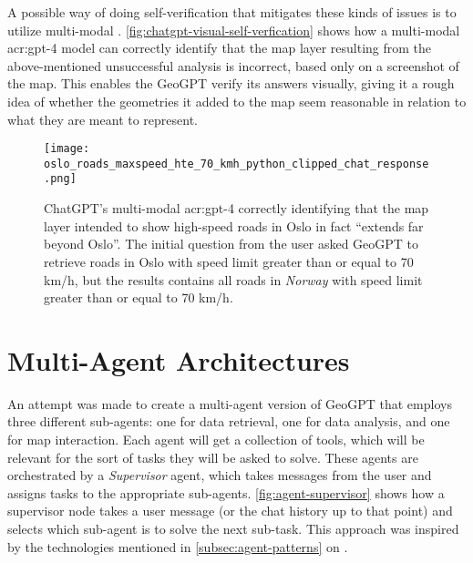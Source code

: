 A possible way of doing self-verification that mitigates these kinds of issues is to utilize multi-modal . \autoref{fig:chatgpt-visual-self-verfication} shows how a multi-modal \acrshort{acr:gpt}-4 model can correctly identify that the map layer resulting from the above-mentioned unsuccessful analysis is incorrect, based only on a screenshot of the map. This enables the GeoGPT verify its answers visually, giving it a rough idea of whether the geometries it added to the map seem reasonable in relation to what they are meant to represent.

\begin{figure}
    \centering
    \texttt{[image: oslo\_roads\_maxspeed\_hte\_70\_kmh\_python\_clipped\_chat\_response.png]}
    \caption[Using the multi-modal GPT-4 model to identify errors in image of generated road map layer]{ChatGPT's multi-modal \acrshort{acr:gpt}-4 correctly identifying that the map layer intended to show high-speed roads in Oslo in fact \enquote{extends far beyond Oslo}. The initial question from the user asked GeoGPT to retrieve roads in Oslo with speed limit greater than or equal to 70 km/h, but the results contains all roads in \textit{Norway} with speed limit greater than or equal to 70 km/h.}
    \label{fig:chatgpt-visual-self-verfication}
\end{figure}


\section{Multi-Agent Architectures}
\label{sec:multi-agent-architectures}

An attempt was made to create a multi-agent version of GeoGPT that employs three different sub-agents: one for data retrieval, one for data analysis, and one for map interaction. Each agent will get a collection of tools, which will be relevant for the sort of tasks they will be asked to solve. These agents are orchestrated by a \textit{Supervisor} agent, which takes messages from the user and assigns tasks to the appropriate sub-agents. \autoref{fig:agent-supervisor} shows how a supervisor node takes a user message (or the chat history up to that point) and selects which sub-agent is to solve the next sub-task. This approach was inspired by the technologies mentioned in \autoref{subsec:agent-patterns} on .



